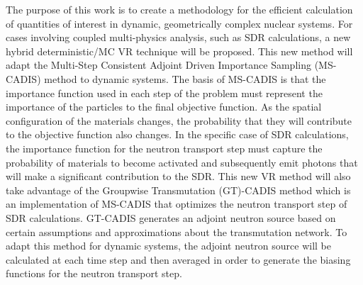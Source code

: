 The purpose of this work is to create a methodology for the efficient calculation
of quantities of
interest in dynamic, geometrically complex nuclear systems.
For cases involving coupled multi-physics analysis, such as SDR calculations,
a new hybrid deterministic/MC VR technique will be proposed.
This new method will adapt the Multi-Step Consistent Adjoint Driven Importance Sampling
(MS-CADIS) method to dynamic systems.
 The basis of MS-CADIS is that the importance function used
in each step of the problem must represent the importance of the particles to
the final objective function.  As the spatial configuration of the materials
changes, the probability that they will contribute to the objective function
also changes.
In the specific case of SDR calculations, the importance function for the neutron transport step
must capture the probability of materials to become activated and subsequently emit photons that
will make a significant contribution to the SDR.
This new VR method will also take advantage of
 the Groupwise Transmutation (GT)-CADIS method 
which is an implementation of MS-CADIS
that optimizes the neutron transport step of SDR calculations.
GT-CADIS generates an adjoint
neutron source based on certain assumptions and approximations about the
transmutation network.  To adapt this method for dynamic systems, the adjoint
neutron source will be calculated at each time step and then averaged
in order to generate the biasing functions for the neutron transport step.


